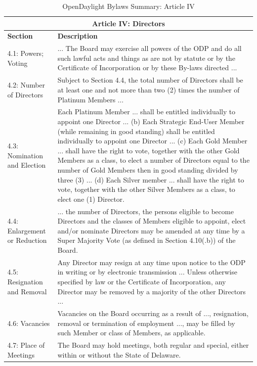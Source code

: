 \documentclass[a4paper, 12pt]{book}
\begin{document}
\begin{table}[H]
  \begin{center}
    \begin{tabular}{ | p{4cm} | p{11cm} | }
    \toprule
    \multicolumn {2}{|c|}{\textbf{Article IV: Directors}} \\
    \hline
    \textbf{Section} & \textbf{Description} \\
    \hline
    4.1: Powers; Voting & ... The Board may exercise all powers of the ODP and do all such lawful acts and things as are not by statute or by the Certificate of Incorporation or by these By-laws directed ...\\
    \hline
    4.2: Number of Directors & Subject to Section 4.4, the total number of Directors shall be at least one and not more than two (2) times the number of Platinum Members ...\\
    \hline
    4.3:  Nomination and Election & Each Platinum Member ... shall be entitled individually to appoint one Director ... (b) Each Strategic End-User Member (while remaining in good standing) shall be entitled individually to appoint one Director ... (c) Each Gold Member ... shall have the right to vote, together with the other Gold Members as a class, to elect a number of Directors equal to the number of Gold Members then in good standing divided by three (3) ... (d) Each Silver member ... shall have the right to vote, together with the other Silver Members as a class, to elect one (1) Director. \\
    \hline
    4.4: Enlargement or Reduction & ... the number of Directors, the persons eligible to become Directors and the classes of Members eligible to appoint, elect and/or nominate Directors may be amended at any time by a Super Majority Vote (as defined in Section 4.10(.b)) of the Board.\\
    \hline
    4.5: Resignation and Removal & Any Director may resign at any time upon notice to the ODP in writing or by electronic transmission ... Unless otherwise specified by law or the Certificate of Incorporation, any Director may be removed by a majority of the other Directors ...\\
    \hline
    4.6: Vacancies & Vacancies on the Board occurring as a result of ..., resignation, removal or termination of employment ..., may be filled by such Member or class of Members, as applicable. \\
    \hline
    4.7: Place of Meetings & The Board may hold meetings, both regular and special, either within or without the State of Delaware. \\
    \bottomrule
    \end{tabular}
    \caption{OpenDaylight Bylaws Summary: Article IV}
    \label{tab:odlbylaws-art04}
  \end{center}
\end{table}
\end{document}

